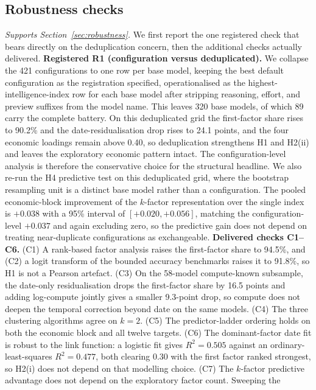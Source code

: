 \subsection{Robustness checks}\label{app:robust}
\emph{Supports Section~\ref{sec:robustness}.} We first report the one registered check that bears
directly on the deduplication concern, then the additional checks actually delivered. \textbf{Registered
R1 (configuration versus deduplicated).} We collapse the 421 configurations to one row per base model,
keeping the best default configuration as the registration specified, operationalised as the
highest-intelligence-index row for each base model after stripping reasoning, effort, and preview
suffixes from the model name. This leaves 320 base models, of which 89 carry the complete battery. On this deduplicated grid the
first-factor share rises to 90.2\% and the date-residualisation drop rises to 24.1 points, and the four
economic loadings remain above 0.40, so deduplication strengthens H1 and H2(ii) and leaves the
exploratory economic pattern intact. The configuration-level analysis is therefore the conservative
choice for the structural headline. We also re-run the H4 predictive test on this deduplicated grid,
where the bootstrap resampling unit is a distinct base model rather than a configuration. The pooled
economic-block improvement of the $k$-factor representation over the single index is $+0.038$ with a 95\%
interval of $[+0.020, +0.056]$, matching the configuration-level $+0.037$ and again excluding zero, so
the predictive gain does not depend on treating near-duplicate configurations as exchangeable. \textbf{Delivered checks C1--C6.} (C1) A rank-based factor analysis
raises the first-factor share to 94.5\%, and (C2) a logit transform of the bounded accuracy benchmarks
raises it to 91.8\%, so H1 is not a Pearson artefact. (C3) On the 58-model compute-known subsample, the
date-only residualisation drops the first-factor share by 16.5 points and adding log-compute jointly
gives a smaller 9.3-point drop, so compute does not deepen the temporal correction beyond date on the
same models. (C4) The three clustering algorithms agree on $k=2$. (C5) The predictor-ladder ordering
holds on both the economic block and all twelve targets. (C6) The dominant-factor date fit is robust to
the link function: a logistic fit gives $R^2=0.505$ against an ordinary-least-squares $R^2=0.477$, both
clearing 0.30 with the first factor ranked strongest, so H2(i) does not depend on that modelling choice.
(C7) The $k$-factor predictive advantage does not depend on the exploratory factor count. Sweeping the
